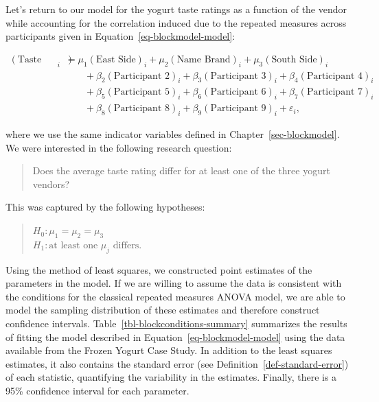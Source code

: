 \documentclass[
  letterpaper,
  DIV=11,
  numbers=noendperiod]{scrreprt}
\theoremstyle{plain}
\theoremstyle{definition}
\theoremstyle{definition}
\theoremstyle{remark}
\begin{document}
Let's return to our model for the yogurt taste ratings as a function of
the vendor while accounting for the correlation induced due to the
repeated measures across participants given in
Equation~\ref{eq-blockmodel-model}:

\[
\begin{aligned}
  (\text{Taste Rating})_i &= \mu_1 (\text{East Side})_i + \mu_2 (\text{Name Brand})_i + \mu_3 (\text{South Side})_i \\
    &\qquad + \beta_2 (\text{Participant 2})_i + \beta_3 (\text{Participant 3})_i + \beta_4 (\text{Participant 4})_i \\
    &\qquad + \beta_5 (\text{Participant 5})_i + \beta_6 (\text{Participant 6})_i + \beta_7 (\text{Participant 7})_i \\
    &\qquad + \beta_8 (\text{Participant 8})_i + \beta_9 (\text{Participant 9})_i + \varepsilon_i,
\end{aligned}
\]

where we use the same indicator variables defined in
Chapter~\ref{sec-blockmodel}. We were interested in the following
research question:

\begin{quote}
Does the average taste rating differ for at least one of the three
yogurt vendors?
\end{quote}

This was captured by the following hypotheses:

\begin{quote}
\(H_0: \mu_1 = \mu_2 = \mu_3\)\\
\(H_1: \text{at least one } \mu_j \text{ differs}.\)
\end{quote}

Using the method of least squares, we constructed point estimates of the
parameters in the model. If we are willing to assume the data is
consistent with the conditions for the classical repeated measures ANOVA
model, we are able to model the sampling distribution of these estimates
and therefore construct confidence intervals.
Table~\ref{tbl-blockconditions-summary} summarizes the results of
fitting the model described in Equation~\ref{eq-blockmodel-model} using
the data available from the Frozen Yogurt Case Study. In addition to the
least squares estimates, it also contains the standard error (see
Definition~\ref{def-standard-error}) of each statistic, quantifying the
variability in the estimates. Finally, there is a 95\% confidence
interval for each parameter.
\end{document}
